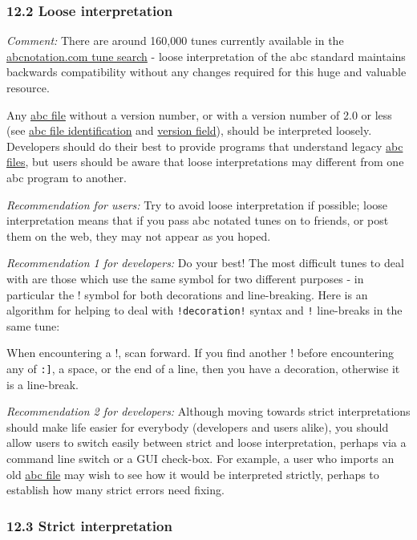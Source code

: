 \hypertarget{loose_interpretation}{\subsubsection{12.2 Loose
interpretation}\label{loose_interpretation}}

\emph{Comment:} There are around 160,000 tunes currently available in
the \href{http://abcnotation.com/search}{abcnotation.com tune search} -
loose interpretation of the abc standard maintains backwards
compatibility without any changes required for this huge and valuable
resource.

Any \protect\hyperlink{abc_file_definition}{abc file} without a version
number, or with a version number of 2.0 or less (see
\protect\hyperlink{abc_file_identification}{abc file identification} and
\protect\hyperlink{version_field}{version field}), should be interpreted
loosely. Developers should do their best to provide programs that
understand legacy \protect\hyperlink{abc_file_definition}{abc files},
but users should be aware that loose interpretations may different from
one abc program to another.

\emph{Recommendation for users:} Try to avoid loose interpretation if
possible; loose interpretation means that if you pass abc notated tunes
on to friends, or post them on the web, they may not appear as you
hoped.

\emph{Recommendation 1 for developers:} Do your best! The most difficult
tunes to deal with are those which use the same symbol for two different
purposes - in particular the ! symbol for both decorations and
line-breaking. Here is an algorithm for helping to deal with
\texttt{!decoration!} syntax and \texttt{!} line-breaks in the same
tune:

When encountering a !, scan forward. If you find another ! before
encountering any of \texttt{\textbar{}{[}:{]}}, a space, or the end of a
line, then you have a decoration, otherwise it is a line-break.

\emph{Recommendation 2 for developers:} Although moving towards strict
interpretations should make life easier for everybody (developers and
users alike), you should allow users to switch easily between strict and
loose interpretation, perhaps via a command line switch or a GUI
check-box. For example, a user who imports an old
\protect\hyperlink{abc_file_definition}{abc file} may wish to see how it
would be interpreted strictly, perhaps to establish how many strict
errors need fixing.

\hypertarget{strict_interpretation}{\subsubsection{12.3 Strict
interpretation}\label{strict_interpretation}}

